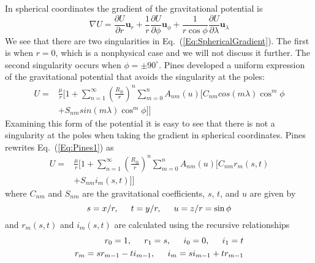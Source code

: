 In spherical coordinates the gradient of the gravitational potential
is
%
\begin{equation}
   \nabla U = \frac{\partial U}{\partial r}\mathbf{u}_r +
   \frac{1}{r}\frac{\partial U}{\partial \phi} \mathbf{u}_\phi
   + \frac{1}{r \cos{\phi}}\frac{\partial U}{\partial
   \lambda}\mathbf{u}_\lambda \label{Eq:SphericalGradient}
\end{equation}
%
We see that there are two singularities in
Eq.~(\ref{Eq:SphericalGradient}).  The first is when $r = 0$, which
is a nonphysical case and we will not discuss it further.  The
second singularity occurs when $ \phi = \pm 90^\circ$.  Pines
\cite{Pines:73} developed a uniform expression of the gravitational
potential that avoids the singularity at the poles:
%
\begin{equation}\begin{split}
    U = & \frac{\mu}{r}  \biggl[   1 + \sum_{n=1}^\infty \left(\frac{R_{\otimes}}{r}\right)^n
    \sum_{m=0}^{n} A_{nm}(u)[C_{nm} cos{(m \lambda)} \cos^m{\phi} \\
    & +S_{nm}sin{(m \lambda)} \cos^m{\phi} ]    \biggr]\end{split}
    \label{Eq:Pines1}
\end{equation}
%
Examining this form of the potential it is easy to see that there is
not a singularity at the poles when taking the gradient in spherical
coordinates.  Pines rewrites Eq.~(\ref{Eq:Pines1}) as
%
\begin{equation}\begin{split}
    U = & \frac{\mu}{r}  \biggl[   1 + \sum_{n=1}^\infty \left(\frac{R_{\otimes}}{r}\right)^n
    \sum_{m=0}^{n} A_{nm}(u)[C_{nm} r_m(s,t) \\
    & +S_{nm} i_m(s,t) ]    \biggr]\end{split}
    \label{Eq:PinesPotential}
\end{equation}
%
where $C_{nm}$ and $S_{nm}$ are the gravitational coefficients, $s$,
$t$, and $u$ are given by
%
\begin{equation}
     s = x/r, \hspace{.2 in} t = y/r, \hspace{.2 in} u = z/r =
     \sin{\phi} \nonumber
\end{equation}
%
and $r_m(s,t)$ and $i_m(s,t)$ are calculated using the recursive
relationships
%
\begin{equation}
    \begin{split}
        r_0 = 1, \hspace{.2 in} r_1 = s, \hspace{.2 in} i_0 = 0,
        \hspace{.2 in} i_1 = t \nonumber\\
        r_m = sr_{m-1} - ti_{m-1}, \hspace{ .2 in} i_m = si_{m-1} +
        tr_{m-1} \nonumber
    \end{split}
\end{equation}


